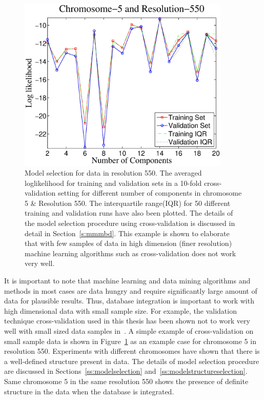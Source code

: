 \begin{figure}[h!]
\centering
\includegraphics[width=0.9\textwidth]{figures/chr5dm550wt}
\caption[Model selection in chromosome 5 and resolution 550]{Model selection for data in resolution 550. The averaged loglikelihood for training and validation sets in a 10-fold cross-validation setting for different number of components in chromosome 5 \& Resolution 550. The interquartile range(IQR) for 50 different training and validation runs have also been plotted. The details of the model selection procedure using cross-validation is discussed in detail in Section~\ref{s:mmmbd}. This example is shown to elaborate that with few samples of data in high dimension (finer resolution) machine learning algorithms such as cross-validation does not work very well.} \label{Fig:chr5dm550}
\end{figure}

It is important to note that machine learning and data mining algorithms and methods in most cases are data hungry and require significantly large amount of data for plausible results. Thus, database integration is important to work with high dimensional data with small sample size. For example, the validation technique cross-validation used in this thesis has been shown not to work very well with small sized data samples in~\cite{unreliable, cvinmicroarray}. A simple example of cross-validation on small sample data is shown in Figure~\ref{Fig:chr5dm550} as an example case for chromosome 5 in resolution 550. Experiments with different chromosomes have shown that there is a well-defined structure present in data. The details of model selection procedure are discussed in Sections~\ref{ss:modelselection} and~\ref{ss:modelstructureselection}. Same chromosome 5 in the same resolution 550 shows the presence of definite structure in the data when the database is integrated. 

